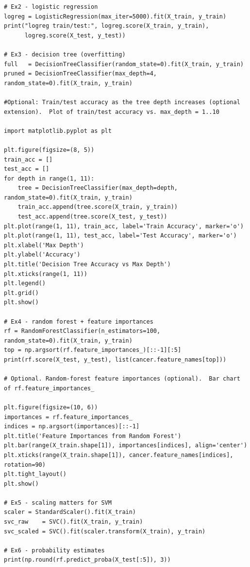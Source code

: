 \documentclass[11pt,a4paper]{article}
\begin{document}
\begin{lstlisting}[caption={Reference solution for Exercises 2--6.}]
# Ex2 - logistic regression
logreg = LogisticRegression(max_iter=5000).fit(X_train, y_train)
print("logreg train/test:", logreg.score(X_train, y_train),
      logreg.score(X_test, y_test))

# Ex3 - decision tree (overfitting)
full   = DecisionTreeClassifier(random_state=0).fit(X_train, y_train)
pruned = DecisionTreeClassifier(max_depth=4, random_state=0).fit(X_train, y_train)

#Optional: Train/test accuracy as the tree depth increases (optional extension).  Plot of train/test accuracy vs. max_depth = 1..10

import matplotlib.pyplot as plt

plt.figure(figsize=(8, 5))
train_acc = []
test_acc = []
for depth in range(1, 11):
    tree = DecisionTreeClassifier(max_depth=depth, random_state=0).fit(X_train, y_train)
    train_acc.append(tree.score(X_train, y_train))
    test_acc.append(tree.score(X_test, y_test))
plt.plot(range(1, 11), train_acc, label='Train Accuracy', marker='o')
plt.plot(range(1, 11), test_acc, label='Test Accuracy', marker='o')
plt.xlabel('Max Depth')
plt.ylabel('Accuracy')
plt.title('Decision Tree Accuracy vs Max Depth')
plt.xticks(range(1, 11))
plt.legend()
plt.grid()
plt.show()

# Ex4 - random forest + feature importances
rf = RandomForestClassifier(n_estimators=100, random_state=0).fit(X_train, y_train)
top = np.argsort(rf.feature_importances_)[::-1][:5]
print(rf.score(X_test, y_test), list(cancer.feature_names[top]))

# Optional. Random-forest feature importances (optional).  Bar chart of rf.feature_importances_

plt.figure(figsize=(10, 6))
importances = rf.feature_importances_
indices = np.argsort(importances)[::-1]
plt.title('Feature Importances from Random Forest')
plt.bar(range(X_train.shape[1]), importances[indices], align='center')
plt.xticks(range(X_train.shape[1]), cancer.feature_names[indices], rotation=90)
plt.tight_layout()
plt.show()

# Ex5 - scaling matters for SVM
scaler = StandardScaler().fit(X_train)
svc_raw    = SVC().fit(X_train, y_train)
svc_scaled = SVC().fit(scaler.transform(X_train), y_train)

# Ex6 - probability estimates
print(np.round(rf.predict_proba(X_test[:5]), 3))
\end{lstlisting}
\end{document}

